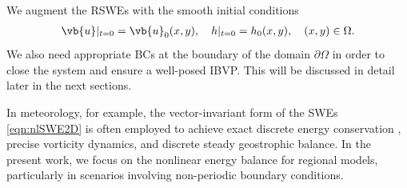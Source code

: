 \documentclass{article}
\numberwithin{equation}{section}
\theoremstyle{definition}
\begin{document}
We augment the RSWEs with the smooth initial conditions
\begin{align}\label{eq:initial-condition}
    \vb{u}|_{t=0} = \vb{u}_0(x,y), \quad {h}|_{t=0} = {h}_0(x,y), \quad (x,y) \in \Omega.
\end{align}
We also need appropriate BCs at the boundary of the domain $\partial \Omega$ in order to close the system and ensure a well-posed IBVP. This will be discussed in detail later in the next sections.

In meteorology, for example, the vector-invariant form of the SWEs \eqref{eqn:nlSWE2D} is often employed to achieve exact discrete energy conservation \cite{ricardo2023conservation, lee2018discrete, lee2018mixed}, precise vorticity dynamics, and discrete steady geostrophic balance. In the present work, we focus on the nonlinear energy balance for regional models, particularly in scenarios involving non-periodic boundary conditions.
\end{document}
